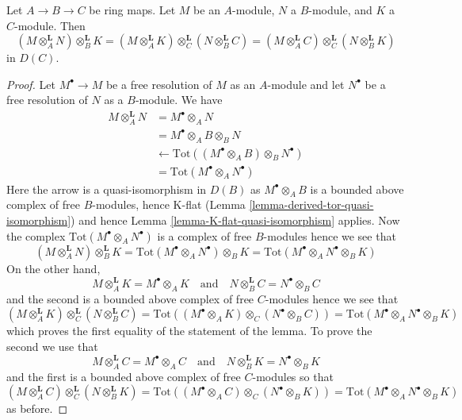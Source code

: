\begin{lemma}
\label{lemma-double-base-change}
Let $A \to B \to C$ be ring maps. Let $M$ be an $A$-module,
$N$ a $B$-module, and $K$ a $C$-module. Then
$$
(M \otimes_A^\mathbf{L} N) \otimes_B^\mathbf{L} K =
(M \otimes_A^\mathbf{L} K) \otimes_C^\mathbf{L} (N \otimes_B^\mathbf{L} C) =
(M \otimes_A^\mathbf{L} C) \otimes_C^\mathbf{L} (N \otimes_B^\mathbf{L} K)
$$
in $D(C)$.
\end{lemma}

\begin{proof}
Let $M^\bullet \to M$ be a free resolution of $M$ as an $A$-module
and let $N^\bullet$ be a free resolution of $N$ as a $B$-module.
We have
\begin{align*}
M \otimes_A^\mathbf{L} N
& =
M^\bullet \otimes_A N \\
& =
M^\bullet \otimes_A B \otimes_B N \\
& \leftarrow
\text{Tot}((M^\bullet \otimes_A B) \otimes_B N^\bullet) \\
& = \text{Tot}(M^\bullet \otimes_A N^\bullet)
\end{align*}
Here the arrow is a quasi-isomorphism in $D(B)$ as $M^\bullet \otimes_A B$
is a bounded above complex of free $B$-modules, hence K-flat
(Lemma \ref{lemma-derived-tor-quasi-isomorphism})
and hence Lemma \ref{lemma-K-flat-quasi-isomorphism} applies.
Now the complex $\text{Tot}(M^\bullet \otimes_A N^\bullet)$ is a
complex of free $B$-modules hence we see that
$$
(M \otimes_A^\mathbf{L} N) \otimes_B^\mathbf{L} K =
\text{Tot}(M^\bullet \otimes_A N^\bullet) \otimes_B K =
\text{Tot}(M^\bullet \otimes_A N^\bullet \otimes_B K)
$$
On the other hand,
$$
M \otimes_A^\mathbf{L} K = M^\bullet \otimes_A K
\quad\text{and}\quad
N \otimes_B^\mathbf{L} C = N^\bullet \otimes_B C
$$
and the second is a bounded above
complex of free $C$-modules hence we see that
$$
(M \otimes_A^\mathbf{L} K) \otimes_C^\mathbf{L} (N \otimes_B^\mathbf{L} C) =
\text{Tot}((M^\bullet \otimes_A K) \otimes_C (N^\bullet \otimes_B C)) =
\text{Tot}(M^\bullet \otimes_A N^\bullet \otimes_B K)
$$
which proves the first equality of the statement of the lemma.
To prove the second we use that
$$
M \otimes_A^\mathbf{L} C = M^\bullet \otimes_A C
\quad\text{and}\quad
N \otimes_B^\mathbf{L} K = N^\bullet \otimes_B K
$$
and the first is a bounded above complex of free $C$-modules so that
$$
(M \otimes_A^\mathbf{L} C) \otimes_C^\mathbf{L} (N \otimes_B^\mathbf{L} K) =
\text{Tot}((M^\bullet \otimes_A C) \otimes_C (N^\bullet \otimes_B K)) =
\text{Tot}(M^\bullet \otimes_A N^\bullet \otimes_B K)
$$
as before.
\end{proof}






